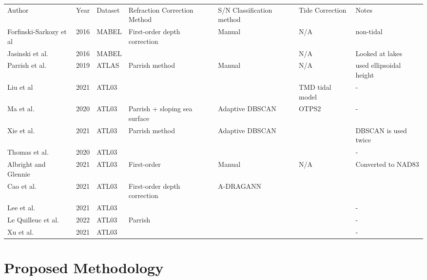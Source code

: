 \begin{sidewaystable}
  \centering
  \begin{tabular}{lllllll}
    \midrule
    Author                  & Year & Dataset & Refraction Correction Method  & S/N Classification method & Tide Correction & Notes                    \\
    Forfinski-Sarkozy et al & 2016 & MABEL   & First-order depth correction  & Manual                    & N/A             & non-tidal                \\
    Jasinski et al.         & 2016 & MABEL   &                               &                           & N/A             & Looked at lakes          \\
    Parrish et al.          & 2019 & ATLAS   & Parrish method                & Manual                    & N/A             & used  ellipsoidal height \\
    Liu et al               & 2021 & ATL03   &                               &                           & TMD tidal model & -                        \\
    Ma et al.               & 2020 & ATL03   & Parrish + sloping sea surface & Adaptive  DBSCAN          & OTPS2           & -                        \\
    Xie et al.              & 2021 & ATL03   & Parrish method                & Adaptive DBSCAN           &                 & DBSCAN  is used twice    \\
    Thomas et al.           & 2020 & ATL03   &                               &                           &                 & -                        \\
    Albright and Glennie    & 2021 & ATL03   & First-order                   & Manual                    & N/A             & Converted to NAD83       \\
    Cao et al.              & 2021 & ATL03   & First-order depth correction  & A-DRAGANN                 &                 &                          \\
    Lee et al.              & 2021 & ATL03   &                               &                           &                 & -                        \\
    Le Quilleuc et al.      & 2022 & ATL03   & Parrish                       &                           &                 & -                        \\
    Xu et al.               & 2021 & ATL03   &                               &                           &                 & -                        \\
    \bottomrule
  \end{tabular}
\end{sidewaystable}
\hypertarget{proposed-methodology}{%
  \chapter{Proposed Methodology}\label{proposed-methodology}}

